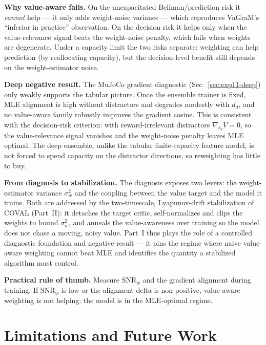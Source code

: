 \documentclass{article}
\theoremstyle{plain}
\begin{document}
\textbf{Why value-aware fails.} On the uncapacitated Bellman/prediction risk it
\emph{cannot} help --- it only adds weight-noise variance --- which reproduces VaGraM's
``inferior in practice'' observation. On the decision risk it helps only when the
value-relevance signal beats the weight-noise penalty, which fails when weights are
degenerate. Under a capacity limit the two risks separate: weighting can help prediction
(by reallocating capacity), but the decision-level benefit still depends on the
weight-estimator noise.

\textbf{Deep negative result.} The MuJoCo gradient diagnostic
(Sec.~\ref{sec:exp11-deep}) only weakly supports the tabular picture. Once the ensemble
trainer is fixed, MLE alignment is high without distractors and degrades modestly with
$d_d$, and no value-aware family robustly improves the gradient cosine. This is consistent
with the decision-risk criterion: with reward-irrelevant distractors
$\nabla_{s_d} V = 0$, so the value-relevance signal vanishes and the weight-noise penalty
leaves MLE optimal. The deep ensemble, unlike the tabular finite-capacity feature model,
is not forced to spend capacity on the distractor directions, so reweighting has little to
buy.

\textbf{From diagnosis to stabilization.} The diagnosis exposes two levers:
the weight-estimator variance $\sigma_w^2$ and the coupling between the value target and
the model it trains. Both are addressed by the two-timescale, Lyapunov-drift
stabilization of COVAL (Part~II): it detaches the target critic,
self-normalizes and clips the weights to bound $\sigma_w^2$, and anneals the
value-awareness over training so the model does not chase a moving, noisy value. Part~I
thus plays the role of a controlled diagnostic foundation and negative result --- it pins
the regime where naive value-aware weighting cannot beat MLE and identifies the quantity a
stabilized algorithm must control.

\textbf{Practical rule of thumb.} Measure $\mathrm{SNR}_w$ and the gradient alignment
during training. If $\mathrm{SNR}_w$ is low or the alignment delta is non-positive,
value-aware weighting is not helping; the model is in the MLE-optimal regime.

\section{Limitations and Future Work}
\end{document}
